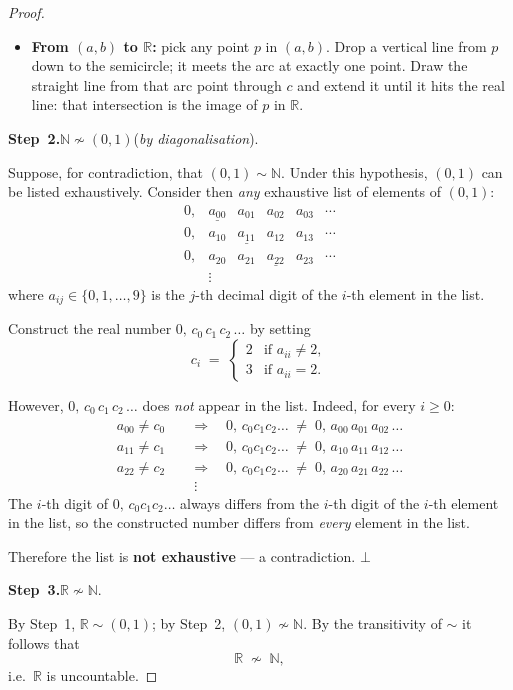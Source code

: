 \documentclass[12pt]{article}
\theoremstyle{definition}
\theoremstyle{plain}
\theoremstyle{remark}
\newcommand{\N}{\mathbb{N}}
\newcommand{\R}{\mathbb{R}}
\begin{document}
\begin{proof}
\begin{itemize}[nosep]
    \item \textbf{From $(a,b)$ to $\R$:} pick any point $p$ in $(a,b)$.
          Drop a vertical line from $p$ down to the semicircle; it meets the
          arc at exactly one point. Draw the straight line from that arc point
          through $c$ and extend it until it hits the real line: that
          intersection is the image of $p$ in $\R$.
\end{itemize}

\medskip
\noindent\textbf{Step~2.}\quad $\N \not\sim (0,1)$\quad(\emph{by diagonalisation}).

\smallskip
Suppose, for contradiction, that $(0,1)\sim\N$. Under this hypothesis,
$(0,1)$ can be listed exhaustively.  Consider then \emph{any} exhaustive list of
elements of $(0,1)$:
\[
\begin{array}{lllllll}
  0, & \underline{a_{00}} & a_{01} & a_{02} & a_{03} & \cdots \\[2pt]
  0, & a_{10} & \underline{a_{11}} & a_{12} & a_{13} & \cdots \\[2pt]
  0, & a_{20} & a_{21} & \underline{a_{22}} & a_{23} & \cdots \\[2pt]
     & \vdots
\end{array}
\]
where $a_{ij}\in\{0,1,\ldots,9\}$ is the $j$-th decimal digit of the $i$-th
element in the list.

Construct the real number $0{,}\,c_0\,c_1\,c_2\,\ldots$ by setting
\[
    c_i \;=\;
    \begin{cases}
        2 & \text{if } a_{ii} \neq 2,\\
        3 & \text{if } a_{ii} = 2.
    \end{cases}
\]

However, $0{,}\,c_0\,c_1\,c_2\,\ldots$ does \emph{not} appear in the list.
Indeed, for every $i\geq 0$:
\begin{align*}
    a_{00} \neq c_0 \quad&\Longrightarrow\quad
    0{,}\,c_0c_1c_2\ldots \;\neq\; 0{,}\,a_{00}\,a_{01}\,a_{02}\,\ldots\\
    a_{11} \neq c_1 \quad&\Longrightarrow\quad
    0{,}\,c_0c_1c_2\ldots \;\neq\; 0{,}\,a_{10}\,a_{11}\,a_{12}\,\ldots\\
    a_{22} \neq c_2 \quad&\Longrightarrow\quad
    0{,}\,c_0c_1c_2\ldots \;\neq\; 0{,}\,a_{20}\,a_{21}\,a_{22}\,\ldots\\
    &\;\vdots
\end{align*}
The $i$-th digit of $0{,}\,c_0c_1c_2\ldots$ always differs from the $i$-th digit of
the $i$-th element in the list, so the constructed number differs from \emph{every}
element in the list.

Therefore the list is \textbf{not exhaustive} --- a contradiction. $\bot$

\medskip
\noindent\textbf{Step~3.}\quad $\R \not\sim \N$.

\smallskip
By Step~1, $\R \sim (0,1)$; by Step~2, $(0,1)\not\sim\N$. By the transitivity
of $\sim$ it follows that
\[
    \R \;\not\sim\; \N,
\]
i.e.\ $\R$ is uncountable.
\end{proof}
\end{document}
